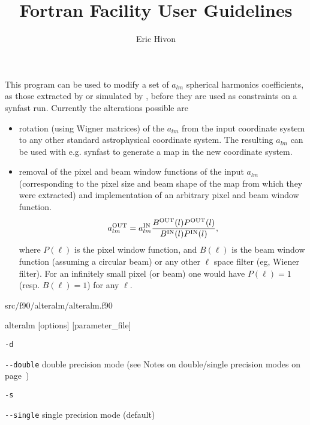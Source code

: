 
\sloppy


\title{\healpix Fortran Facility User Guidelines}
 \section[alteralm]{\nosectionname}
\label{fac:alteralm}
\author{Eric Hivon}

\begin{facility}
{This program can be used to modify a set of $a_{lm}$ spherical harmonics
  coefficients, as those extracted by  or 
  simulated by , before
  they are used as constraints on a synfast run. Currently the alterations
  possible are %
\begin{itemize}
    \item rotation (using Wigner matrices) of the $a_{lm}$ from the input
    coordinate system to any other standard astrophysical coordinate system. The
    resulting $a_{lm}$ can be used with e.g. synfast to generate a map in the
    new coordinate system.
    \item removal of the pixel and beam window functions of the input
  $a_{lm}$ (corresponding to the pixel size and beam shape of the map from which
  they were extracted) and implementation of an arbitrary pixel and beam window
  function.
 \begin{equation} a_{\ell m}^{\rm OUT} = a_{\ell m}^{\rm IN} \frac{B^{\rm OUT}(\ell) P^{\rm 
 OUT}(\ell)}{B^{\rm IN}(\ell) P^{\rm IN}(\ell)}, \label{eq:alteralm} \end{equation}
where $P(\ell)$ is the pixel window function, and $B(\ell)$ is the beam window
 function (assuming a circular beam) or any other $\ell$ space filter (eg,
 Wiener filter). For an infinitely small pixel (or beam) one would have $P(\ell) =
 1$ (resp. $B(\ell) = 1$) for any $\ell$.
\end{itemize}%
}
{src/f90/alteralm/alteralm.f90}
\end{facility}

\begin{f90facility}
{alteralm [options] [parameter\_file]}
\end{f90facility}

\begin{options}
  \begin{optionlistwide}{} %
    \item[{\tt -d}]
    \item[{\tt -}{\tt -}{\tt double}] double precision mode (see Notes on double/single precision modes on page~\pageref{page:ioprec})
    \item[{\tt -s}]
    \item[{\tt -}{\tt -}{\tt single}] single precision mode (default)
  \end{optionlistwide}
\end{options}

